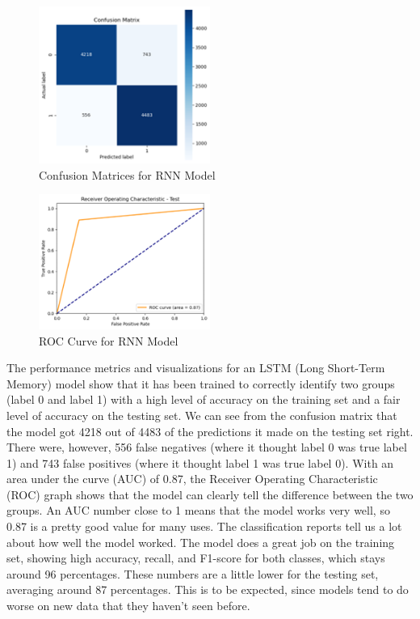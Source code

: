 \documentclass[11pt,a4paper]{article}
\begin{document}
\begin{figure}[ht]
    \centering
    \includegraphics[width=0.5\textwidth]{RNN-2.png}
    \caption{Confusion Matrices for RNN Model}
    \label{fig:polarity_distribution}
\end{figure}

\begin{figure}[ht]
    \centering
    \includegraphics[width=0.5\textwidth]{rnn-3.png}
    \caption{ROC Curve for RNN Model}
    \label{fig:polarity_distribution}
\end{figure}



The performance metrics and visualizations for an LSTM (Long Short-Term Memory) model show that it has been trained to correctly identify two groups (label 0 and label 1) with a high level of accuracy on the training set and a fair level of accuracy on the testing set.
We can see from the confusion matrix that the model got 4218 out of 4483 of the predictions it made on the testing set right. There were, however, 556 false negatives (where it thought label 0 was true label 1) and 743 false positives (where it thought label 1 was true label 0).
With an area under the curve (AUC) of 0.87, the Receiver Operating Characteristic (ROC) graph shows that the model can clearly tell the difference between the two groups. An AUC number close to 1 means that the model works very well, so 0.87 is a pretty good value for many uses.
The classification reports tell us a lot about how well the model worked. The model does a great job on the training set, showing high accuracy, recall, and F1-score for both classes, which stays around 96 percentages. These numbers are a little lower for the testing set, averaging around 87 percentages. This is to be expected, since models tend to do worse on new data that they haven't seen before.
\end{document}
